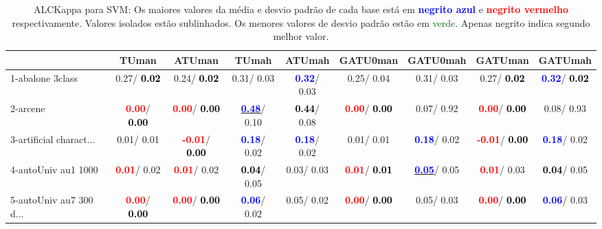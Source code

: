 \begin{table}[h]
\caption{ALCKappa para SVM: Os maiores valores da média e desvio padrão de cada base está em \textcolor{blue}{\textbf{negrito azul}} e \textcolor{red}{\textbf{negrito vermelho}} respectivamente. Valores isolados estão sublinhados. Os menores valores de desvio padrão estão em \textcolor{darkgreen}{verde}. Apenas negrito indica segundo melhor valor.}
\begin{center}\begin{tabular}{lc|c|c|c|c|c|c|c}
 & TUman & \textbf{ATUman} & TUmah & \textbf{ATUmah} & GATU0man & GATU0mah & GATUman & GATUmah\\ \hline 1-abalone 3class &   0.27/\textcolor{black}{\textbf{  0.02}} &   0.24/\textcolor{black}{\textbf{  0.02}} &   0.31/  0.03 & \textcolor{blue}{\textbf{  0.32}}/  0.03 &   0.25/  0.04 &   0.31/  0.03 &   0.27/\textcolor{black}{\textbf{  0.02}} & \textcolor{blue}{\textbf{  0.32}}/\textcolor{black}{\textbf{  0.02}} \\
2-arcene & \textcolor{red}{\textbf{  0.00}}/\textcolor{black}{\textbf{  0.00}} & \textcolor{red}{\textbf{  0.00}}/\textcolor{black}{\textbf{  0.00}} & \underline{\textcolor{blue}{\textbf{  0.48}}}/  0.10 & \textcolor{black}{\textbf{  0.44}}/  0.08 & \textcolor{red}{\textbf{  0.00}}/\textcolor{black}{\textbf{  0.00}} &   0.07/  0.92 & \textcolor{red}{\textbf{  0.00}}/\textcolor{black}{\textbf{  0.00}} &   0.08/  0.93 \\
3-artificial charact... &   0.01/  0.01 & \textcolor{red}{\textbf{ -0.01}}/\textcolor{black}{\textbf{  0.00}} & \textcolor{blue}{\textbf{  0.18}}/  0.02 & \textcolor{blue}{\textbf{  0.18}}/  0.02 &   0.01/  0.01 & \textcolor{blue}{\textbf{  0.18}}/  0.02 & \textcolor{red}{\textbf{ -0.01}}/\textcolor{black}{\textbf{  0.00}} & \textcolor{blue}{\textbf{  0.18}}/  0.02 \\
4-autoUniv au1 1000 & \textcolor{red}{\textbf{  0.01}}/  0.02 & \textcolor{red}{\textbf{  0.01}}/  0.02 & \textcolor{black}{\textbf{  0.04}}/  0.05 &   0.03/  0.03 & \textcolor{red}{\textbf{  0.01}}/\textcolor{black}{\textbf{  0.01}} & \underline{\textcolor{blue}{\textbf{  0.05}}}/  0.05 & \textcolor{red}{\textbf{  0.01}}/  0.03 & \textcolor{black}{\textbf{  0.04}}/  0.05 \\
5-autoUniv au7 300 d... & \textcolor{red}{\textbf{  0.00}}/\textcolor{black}{\textbf{  0.00}} & \textcolor{red}{\textbf{  0.00}}/\textcolor{black}{\textbf{  0.00}} & \textcolor{blue}{\textbf{  0.06}}/  0.02 &   0.05/  0.02 & \textcolor{red}{\textbf{  0.00}}/\textcolor{black}{\textbf{  0.00}} &   0.05/  0.03 & \textcolor{red}{\textbf{  0.00}}/\textcolor{black}{\textbf{  0.00}} & \textcolor{blue}{\textbf{  0.06}}/  0.03 \\

\end{tabular}
\end{center}
\end{table}
